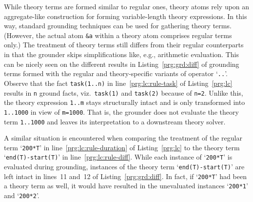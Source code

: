 While theory terms are formed similar to regular ones,
theory atoms rely upon an aggregate-like construction for forming variable-length theory expressions.
In this way, standard grounding techniques can be used for gathering theory terms.
(However, the actual atom \lstinline{&a} within a theory atom comprises regular terms only.)
%
The treatment of theory terms still %
differs from their regular counterparts
in that the grounder skips simplifications like, e.g., arithmetic evaluation.
This can be nicely seen on the different results in Listing~\ref{prg:grd:diff} of grounding terms formed with
the regular and theory-specific variants of operator `\lstinline{..}'.
Observe that
the fact \lstinline{task(1..n)} in line~\ref{prg:lc:rule-task} of Listing~\ref{prg:lc} results in \lstinline{n} ground facts,
viz.\ \lstinline{task(1)} and \lstinline{task(2)} because of \lstinline{n=2}.
Unlike this, the theory expression \lstinline{1..m} stays structurally intact and is only transformed into \lstinline{1..1000} in view of \lstinline{m=1000}.
That is, the grounder does not evaluate the theory term \lstinline{1..1000} and
leaves its interpretation to a downstream theory solver.
%

%
A similar situation is encountered when comparing the treatment of the regular term `\lstinline{200*T}' in line~\ref{prg:lc:rule-duration} of Listing~\ref{prg:lc} to the
theory term `\lstinline{end(T)-start(T)}' in line~\ref{prg:lc:rule-diff}.
While each instance of `\lstinline{200*T}' is evaluated during grounding,
instances of the theory term `\lstinline{end(T)-start(T)}' are left intact in lines~11 and~12 of Listing~\ref{prg:grd:diff}.
In fact, if `\lstinline{200*T}' had been a theory term as well,
it would have resulted in the unevaluated instances  `\lstinline{200*1}' and `\lstinline{200*2}'.

